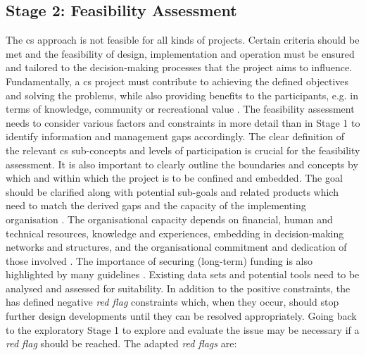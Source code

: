 \subsection{Stage 2: Feasibility Assessment}\label{subsec:stage2_design}

The \acrlong{cs} approach is not feasible for all kinds of projects. Certain criteria should be met and the feasibility of design, implementation and operation must be ensured and tailored to the decision-making processes that the project aims to influence. Fundamentally, a \acrshort{cs} project must contribute to achieving the defined objectives and solving the problems, while also providing benefits to the participants, e.g. in terms of knowledge, community or recreational value \autocite{escaTenPrinciplesCitizen2015}. The feasibility assessment needs to consider various factors and constraints in more detail than in Stage 1 to identify information and management gaps accordingly. The clear definition of the relevant \acrshort{cs} sub-concepts and levels of participation is crucial for the feasibility assessment. It is also important to clearly outline the boundaries and concepts by which and within which the project is to be confined and embedded. The goal should be clarified along with potential sub-goals and related products which need to match the derived gaps and the capacity of the implementing organisation \autocite{ifrcCommunityBasedSurveillanceGuiding2017,minkmanCitizenScienceWater2015}. The organisational capacity depends on financial, human and technical resources, knowledge and experiences, embedding in decision-making networks and structures, and the organisational commitment and dedication of those involved \autocite{fraislCitizenScienceEnvironmental2022,ifrcCommunityBasedSurveillanceGuiding2017}. The importance of securing (long-term) funding is also highlighted by many guidelines \autocite{cervoniImplementingIntegratedWater2008,minkmanCitizenScienceWater2015,sharpeCommunityBasedEcological2006, whitelawEstablishingCanadianCommunity2003}. Existing data sets and potential tools need to be analysed and assessed for suitability. In addition to the positive constraints, the \textcite{ifrcCommunityBasedSurveillanceGuiding2017} has defined negative \textit{red flag} constraints which, when they occur, should stop further design developments until they can be resolved appropriately. Going back to the exploratory Stage 1 to explore and evaluate the issue may be necessary if a \textit{red flag} should be reached. The adapted \textit{red flags} are:


